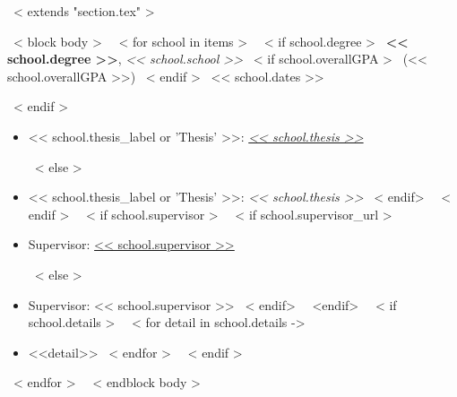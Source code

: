~< extends "section.tex" >~

~< block body >~
~< for school in items >~
  ~< if school.degree >~
    \textbf{<< school.degree >>}, \emph{<< school.school >>}
    ~< if school.overallGPA >~
        (<< school.overallGPA >>)
    ~< endif >~
    \hfill << school.dates >> \par
  ~< endif >~
  \begin{itemize}
  ~< if school.thesis >~
    ~< if school.thesis_url >~
      \item << school.thesis_label or 'Thesis' >>: \href{<< school.thesis_url >>}{\textit{<< school.thesis >>}} \par
    ~< else >~
      \item << school.thesis_label or 'Thesis' >>: \textit{<< school.thesis >>}
    ~< endif>~
  ~< endif >~
  ~< if school.supervisor >~
    ~< if school.supervisor_url >~
      \item Supervisor: \href{<< school.supervisor_url >>}{<< school.supervisor >>} \par
    ~< else >~
      \item Supervisor: << school.supervisor >>
    ~< endif>~
  ~<endif>~
  ~< if school.details >~
    ~< for detail in school.details ->~
        \item <<detail>>
    ~< endfor >~
  ~< endif >~
  \end{itemize}
  \vspace{3mm}
~< endfor >~
\vspace{-3mm}
~< endblock body >~
